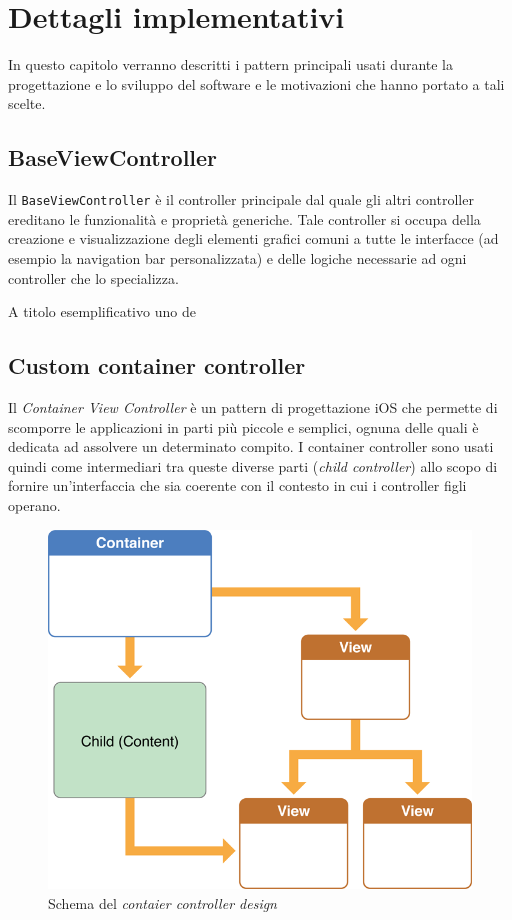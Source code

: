 \chapter{Dettagli implementativi}

In questo capitolo verranno descritti i pattern principali usati durante la progettazione e lo sviluppo del software e le motivazioni che hanno portato a tali scelte.

\section{BaseViewController}
Il \texttt{BaseViewController} è il controller principale dal quale gli altri controller ereditano le funzionalità e proprietà generiche. Tale controller si occupa della creazione e visualizzazione degli  elementi grafici comuni a tutte le interfacce (ad esempio la navigation bar personalizzata) e delle logiche necessarie ad ogni controller che lo specializza.

A titolo esemplificativo uno de

\section{Custom container controller}
Il \emph{Container View Controller} è un pattern di progettazione iOS che permette di scomporre le applicazioni in parti più piccole e semplici, ognuna delle quali è dedicata ad assolvere un determinato compito. I container controller sono usati quindi come intermediari tra queste diverse parti (\emph{child controller}) allo scopo di fornire un'interfaccia che sia coerente con il contesto in cui i controller figli operano.

\begin{figure}[!htbp]
\centering
\includegraphics[scale=0.30]{architettura/container.png}
\caption{Schema del \emph{contaier controller design}}
\label{fig:selettore}
\end{figure}

